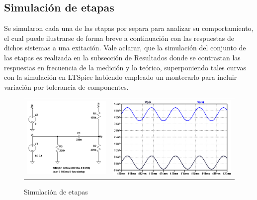 \subsection{Simulaci\'on de etapas}
Se simularon cada una de las etapas por separa para analizar su comportamiento, el cual puede ilustrarse de forma breve a continuaci\'on con las respuestas de dichos sistemas a una exitaci\'on.
Vale aclarar, que la simulaci\'on del conjunto de las etapas es realizada en la subsecci\'on de Resultados donde se contrastan las respuestas en frecuencia de la medici\'on y lo te\'orico, superponiendo
tales curvas con la simulaci\'on en LTSpice habiendo empleado un montecarlo para incluir variaci\'on por tolerancia de componentes.

\begin{figure}[H]
    \centering
    \caption{Simulaci\'on de etapas}
    \begin{tabular}{c c}
        \includegraphics[scale=0.5]{../EJ5/Recursos/Simulaciones/circuito_offset.png} &
        \includegraphics[scale=0.47]{../EJ5/Recursos/Simulaciones/medicion_offset.png} \\

\end{tabular}
\end{figure}
